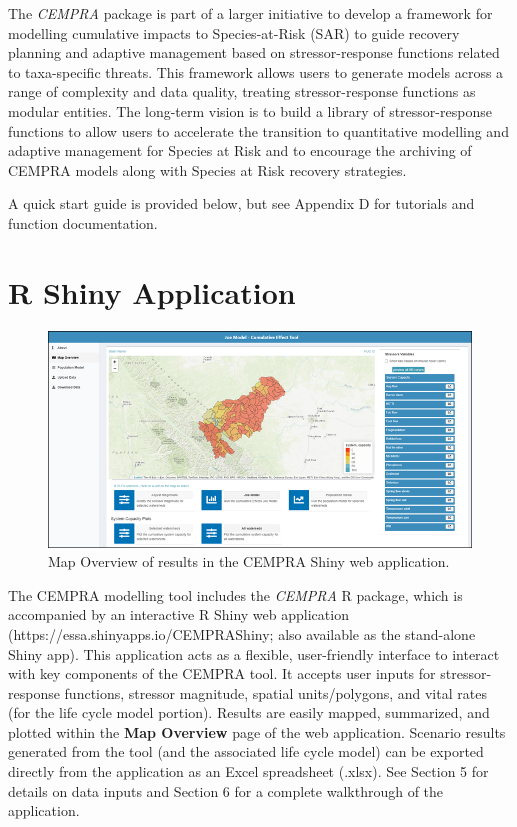 \documentclass[
  letterpaper,
  DIV=11,
  numbers=noendperiod]{scrreprt}
\begin{document}
The \emph{CEMPRA} package is part of a larger initiative to develop a
framework for modelling cumulative impacts to Species-at-Risk (SAR) to
guide recovery planning and adaptive management based on
stressor-response functions related to taxa-specific threats. This
framework allows users to generate models across a range of complexity
and data quality, treating stressor-response functions as modular
entities. The long-term vision is to build a library of
stressor-response functions to allow users to accelerate the transition
to quantitative modelling and adaptive management for Species at Risk
and to encourage the archiving of CEMPRA models along with Species at
Risk recovery strategies.

A quick start guide is provided below, but see Appendix D for tutorials
and function documentation.

\hypertarget{r-shiny-application}{%
\section{R Shiny Application}\label{r-shiny-application}}

\begin{figure}

{\centering \includegraphics{images/image011.png}

}

\caption{\label{fig-figure7}Map Overview of results in the CEMPRA Shiny
web application.}

\end{figure}

The CEMPRA modelling tool includes the \emph{CEMPRA} R package, which is
accompanied by an interactive R Shiny web application
(https://essa.shinyapps.io/CEMPRAShiny; also available as the
stand-alone Shiny app). This application acts as a flexible,
user-friendly interface to interact with key components of the CEMPRA
tool. It accepts user inputs for stressor-response functions, stressor
magnitude, spatial units/polygons, and vital rates (for the life cycle
model portion). Results are easily mapped, summarized, and plotted
within the \textbf{Map Overview} page of the web application. Scenario
results generated from the tool (and the associated life cycle model)
can be exported directly from the application as an Excel spreadsheet
(.xlsx). See Section 5 for details on data inputs and Section 6 for a
complete walkthrough of the application.
\end{document}
